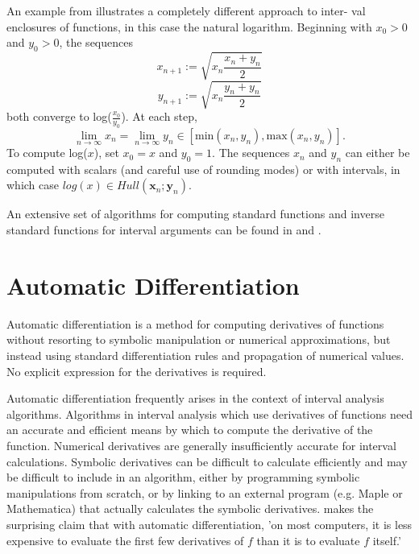 An example from \cite{Kramer:multiple:precision} 
illustrates a completely different approach to inter- 
val enclosures of functions, in this case the natural logarithm. 
Beginning with $x_0 > 0$ and $y_0 > 0$, the sequences 
$$
x_{n+1} := \sqrt{x_n \frac{x_n + y_n}{2}}
$$
$$
y_{n+1} := \sqrt{x_n \frac{y_n + y_n}{2}}
$$
both converge to log($\frac{x_0}{y_0}$). At each step, 
$$
\lim_{n \rightarrow \infty} x_n = \lim_{n \rightarrow \infty} y_n \in
[\mbox{min}(x_n, y_n), \mbox{max}(x_n, y_n)].
$$
To compute log($x$), set $x_0 = x$ and $y_0 = 1$. 
The sequences $x_n$ and $y_n$ can either be 
computed with scalars (and careful use of rounding modes) or with intervals, in which 
case $log(x) \in Hull(\mathbf{x}_n ; \mathbf{y}_n )$. 

An extensive set of algorithms for computing standard functions and inverse standard 
functions for interval arguments can be found in \cite{Brane} and
\cite{Kramer}.

\section{Automatic Differentiation}

Automatic differentiation is a method for computing derivatives of functions
without resorting to symbolic manipulation or numerical approximations, but
instead using standard differentiation rules and propagation of numerical
values. No explicit expression for the derivatives is required. 

Automatic differentiation frequently arises in the context of interval
analysis algorithms. Algorithms in interval analysis which use derivatives of
functions need an accurate and efficient means by which to compute the
derivative of the function. Numerical derivatives are generally insufficiently
accurate for interval calculations. Symbolic  
derivatives can be difficult to calculate efficiently and may be difficult to
include in an  
algorithm, either by programming symbolic manipulations from scratch, or by
linking to an external program (e.g. Maple or Mathematica) that actually
calculates the symbolic derivatives. \cite{Corliss88} makes the surprising
claim that with automatic differentiation, 'on most computers, it is less expensive to evaluate the
first few derivatives of $f$  
than it is to evaluate $f$ itself.'

